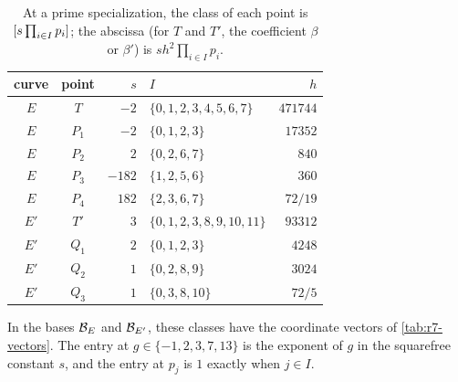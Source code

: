 \begin{table}[htbp]
\centering
\caption{At a prime specialization, the class of each point is
$[s\prod_{i\in I}p_i]$; the abscissa (for $T$ and $T'$, the coefficient $\beta$ or $\beta'$) is $sh^2\prod_{i\in I}p_i$.}
\label{tab:r7-classes}
\begin{tabular}{ccrlr}
\toprule
curve & point & $s$ & $I$ & $h$\\
\midrule
$E$ & $T$ & $-2$ & $\{0,1,2,3,4,5,6,7\}$ & $471744$\\
$E$ & $P_1$ & $-2$ & $\{0,1,2,3\}$ & $17352$\\
$E$ & $P_2$ & $2$ & $\{0,2,6,7\}$ & $840$\\
$E$ & $P_3$ & $-182$ & $\{1,2,5,6\}$ & $360$\\
$E$ & $P_4$ & $182$ & $\{2,3,6,7\}$ & $72/19$\\
\addlinespace
$E'$ & $T'$ & $3$ & $\{0,1,2,3,8,9,10,11\}$ & $93312$\\
$E'$ & $Q_1$ & $2$ & $\{0,1,2,3\}$ & $4248$\\
$E'$ & $Q_2$ & $1$ & $\{0,2,8,9\}$ & $3024$\\
$E'$ & $Q_3$ & $1$ & $\{0,3,8,10\}$ & $72/5$\\
\bottomrule
\end{tabular}
\end{table}

In the bases $\mathcal B_E$ and $\mathcal B_{E'}$, these classes have the coordinate
vectors of \cref{tab:r7-vectors}. The entry at $g\in\{-1,2,3,7,13\}$ is the
exponent of $g$ in the squarefree constant $s$, and the entry at $p_j$
is $1$ exactly when $j\in I$.

